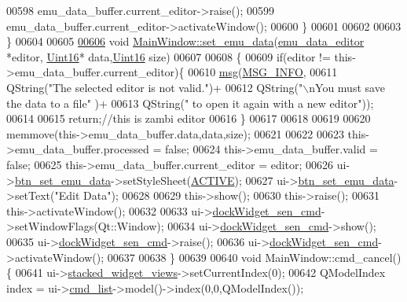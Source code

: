 \begin{DoxyCode}
00598       emu\_data\_buffer.current\_editor->raise();
00599       emu\_data\_buffer.current\_editor->activateWindow();
00600  \}
00601 
00602 
00603 \}
00604 
00605 
\hypertarget{a00047_source_l00606}{}\hyperlink{a00006_ae9bed0c4d2f2c63c95a68f53f65f4359}{00606} \textcolor{keywordtype}{void} \hyperlink{a00006_ae9bed0c4d2f2c63c95a68f53f65f4359}{MainWindow::set\_emu\_data}(\hyperlink{a00004}{emu\_data\_editor} *editor,
      \hyperlink{a00001_aae7407b021d43f7193a81a58cfb3e297}{Uint16}* data,\hyperlink{a00001_aae7407b021d43f7193a81a58cfb3e297}{Uint16} size)
00607 
00608 \{
00609     \textcolor{keywordflow}{if}(editor != this->emu\_data\_buffer.current\_editor)\{
00610       \hyperlink{a00006_a6134b74dbfffbaf333e169bd09597b53}{msg}(\hyperlink{a00034_a1ddcc97224a95cec04b38b0ac866fa19}{MSG\_INFO},
00611           QString(\textcolor{stringliteral}{"The selected editor is not valid."})+
00612           QString(\textcolor{stringliteral}{"\(\backslash\)nYou must save the data to a file"} )+
00613           QString(\textcolor{stringliteral}{" to open it again with a new editor"}));
00614 
00615         \textcolor{keywordflow}{return};\textcolor{comment}{//this is zambi editor}
00616     \}
00617 
00618 
00619 
00620     memmove(this->emu\_data\_buffer.data,data,size);
00621 
00622 
00623     this->emu\_data\_buffer.processed = \textcolor{keyword}{false};
00624     this->emu\_data\_buffer.valid = \textcolor{keyword}{false};
00625     this->emu\_data\_buffer.current\_editor = editor;
00626     ui->\hyperlink{a00027_ad05944ce9c8afb0ab60549a326b8e0af}{btn\_set\_emu\_data}->setStyleSheet(\hyperlink{a00034_a3a6d3cd70078e6046471ec528a09cd19}{ACTIVE});
00627     ui->\hyperlink{a00027_ad05944ce9c8afb0ab60549a326b8e0af}{btn\_set\_emu\_data}->setText(\textcolor{stringliteral}{"Edit Data"});
00628 
00629     this->show();
00630     this->\textcolor{keyword}{raise}();
00631     this->activateWindow();
00632 
00633     ui->\hyperlink{a00027_a9eb86a5ee396766f0f4a65f2d2bd7688}{dockWidget\_sen\_cmd}->setWindowFlags(Qt::Window);
00634     ui->\hyperlink{a00027_a9eb86a5ee396766f0f4a65f2d2bd7688}{dockWidget\_sen\_cmd}->show();
00635     ui->\hyperlink{a00027_a9eb86a5ee396766f0f4a65f2d2bd7688}{dockWidget\_sen\_cmd}->raise();
00636     ui->\hyperlink{a00027_a9eb86a5ee396766f0f4a65f2d2bd7688}{dockWidget\_sen\_cmd}->activateWindow();
00637 
00638 \}
00639 
00640 \textcolor{keywordtype}{void} MainWindow::cmd\_cancel()\{
00641     ui->\hyperlink{a00027_a59e39bd3d716004e840a5be5dda18b96}{stacked\_widget\_views}->setCurrentIndex(0);
00642     QModelIndex index = ui->\hyperlink{a00027_aa66ece71395b435e915d384fb63bac1d}{cmd\_list}->model()->index(0,0,QModelIndex());

\end{DoxyCode}
